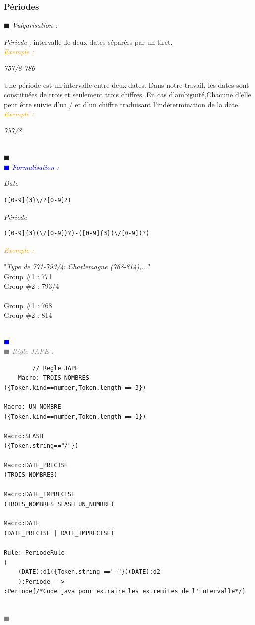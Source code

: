 \documentclass[a4paper, 11pt]{report}
\newenvironment{vulgarisation}
    {
    \textit{\textcolor{dark-blue}{$\blacksquare$  Vulgarisation : \\}}

    }
    {
    ~\\\textcolor{dark-blue}{$\blacksquare$}\\
    }
\newenvironment{formalisation}
    {
    \textit{\textcolor{blue}{$\blacksquare$  Formalisation : \\}}
    }
    {
    ~\\\textcolor{blue}{$\blacksquare$}\\
    }
\newenvironment{codage}
    {
    \textit{\textcolor{gray}{$\blacksquare$  Règle JAPE : \\}}
    }
    {
    ~\\\textcolor{gray}{$\blacksquare$}\\
    }
\newenvironment{exemple}
    {
    \textit{\textcolor{orange}{
    Exemple : \\}}
    }
    {~\\
    }
\begin{document}
	\subsubsection{Périodes}
\begin{vulgarisation}
	\textit{Période} : intervalle de deux dates séparées par un tiret.\\
	\begin{exemple}
		\textit{757/8-786}
	\end{exemple}
	
	Une période est un intervalle entre deux dates. Dans notre travail, les dates sont constituées de trois et seulement trois chiffres. En cas d'ambiguïté,Chacune d'elle peut être suivie d'un \og/\fg{} et d'un chiffre traduisant l'indétermination de la date.\\
	\begin{exemple}
		\textit{757/8}
	\end{exemple}
	
\end{vulgarisation}
\begin{formalisation}
	\textit{Date}
	\begin{verbatim}
([0-9]{3}\/?[0-9]?)
	\end{verbatim}
	\textit{Période}
	\begin{verbatim}
([0-9]{3}(\/[0-9])?)-([0-9]{3}(\/[0-9])?)
	\end{verbatim}
	\begin{exemple}
		"\emph{Type de 771-793/4: Charlemagne (768-814),...}" \\
		Group \#1 : 771 \\
		Group \#2 : 793/4\\\\\noindent
		Group \#1 : 768 \\
		Group \#2 : 814
	\end{exemple}
\end{formalisation}
	\begin{codage}
	\begin{lstlisting}
		// Regle JAPE
	Macro: TROIS_NOMBRES
({Token.kind==number,Token.length == 3})

Macro: UN_NOMBRE
({Token.kind==number,Token.length == 1})

Macro:SLASH
({Token.string=="/"})

Macro:DATE_PRECISE
(TROIS_NOMBRES)

Macro:DATE_IMPRECISE
(TROIS_NOMBRES SLASH UN_NOMBRE)

Macro:DATE
(DATE_PRECISE | DATE_IMPRECISE)

Rule: PeriodeRule
(
	(DATE):d1({Token.string =="-"})(DATE):d2
    ):Periode -->
:Periode{/*Code java pour extraire les extremites de l'intervalle*/}
	\end{lstlisting}
	\end{codage}
	
\end{document}

